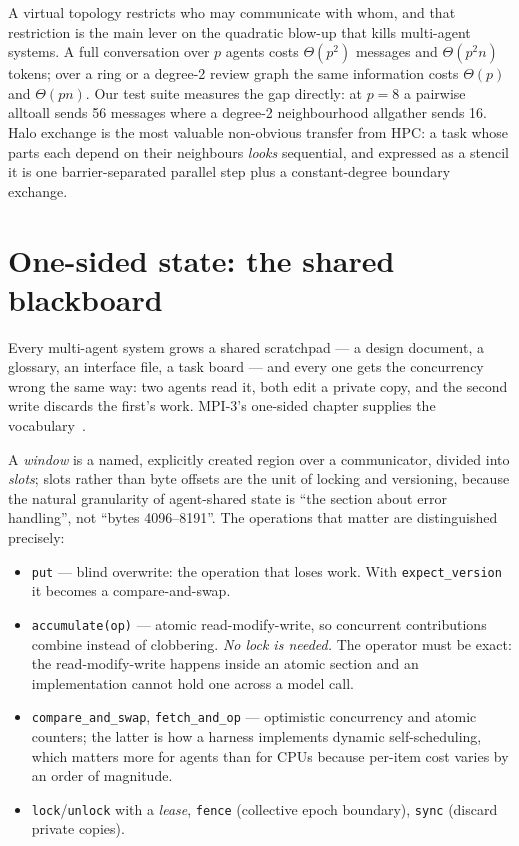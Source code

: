 \documentclass[10pt,twocolumn]{article}
\theoremstyle{definition}
\theoremstyle{plain}
\newcommand{\code}[1]{\texttt{\small #1}}
\begin{document}
A virtual topology restricts who may communicate with whom, and that restriction is
the main lever on the quadratic blow-up that kills multi-agent systems. A full
conversation over $p$ agents costs $\Theta(p^2)$ messages and $\Theta(p^2 n)$
tokens; over a ring or a degree-2 review graph the same information costs
$\Theta(p)$ and $\Theta(pn)$. Our test suite measures the gap directly: at $p=8$ a
pairwise alltoall sends 56 messages where a degree-2 neighbourhood allgather sends
16. Halo exchange is the most valuable non-obvious transfer from HPC: a task whose
parts each depend on their neighbours \emph{looks} sequential, and expressed as a
stencil it is one barrier-separated parallel step plus a constant-degree boundary
exchange.

\section{One-sided state: the shared blackboard}
\label{sec:rma}

Every multi-agent system grows a shared scratchpad --- a design document, a
glossary, an interface file, a task board --- and every one gets the concurrency
wrong the same way: two agents read it, both edit a private copy, and the second
write discards the first's work. MPI-3's one-sided chapter supplies the
vocabulary~\cite{hoefler15-rma,dinan16-rma}.

A \emph{window} is a named, explicitly created region over a communicator, divided
into \emph{slots}; slots rather than byte offsets are the unit of locking and
versioning, because the natural granularity of agent-shared state is ``the section
about error handling'', not ``bytes 4096--8191''. The operations that matter are
distinguished precisely:

\begin{itemize}\itemsep2pt
\item \code{put} --- blind overwrite: the operation that loses work. With
\code{expect\_version} it becomes a compare-and-swap.
\item \code{accumulate(op)} --- atomic read-modify-write, so concurrent
contributions combine instead of clobbering. \emph{No lock is needed.} The operator
must be exact: the read-modify-write happens inside an atomic section and an
implementation cannot hold one across a model call.
\item \code{compare\_and\_swap}, \code{fetch\_and\_op} --- optimistic concurrency
and atomic counters; the latter is how a harness implements dynamic
self-scheduling, which matters more for agents than for CPUs because per-item cost
varies by an order of magnitude.
\item \code{lock}/\code{unlock} with a \emph{lease}, \code{fence} (collective epoch
boundary), \code{sync} (discard private copies).
\end{itemize}
\end{document}
